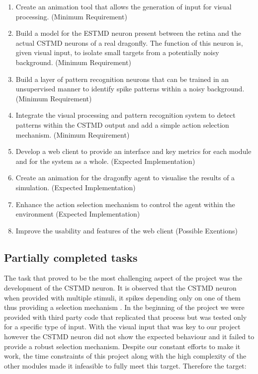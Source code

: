 \documentclass[a4paper,11pt]{article}
\begin{document}
\begin{enumerate}

 \item{Create an animation tool that allows the generation of input for visual processing. (Minimum 
Requirement)}

\item{Build a model for the ESTMD neuron present between the retina and the actual CSTMD 
neurons of a real dragonfly. The function of this neuron is, given visual input, to isolate small targets 
from a potentially noisy background. (Minimum Requirement)}  

\item{Build a layer of pattern recognition neurons that can be trained in an unsupervised manner to 
identify spike patterns within a noisy background. (Minimum Requirement)}

\item{Integrate the visual processing and pattern recognition system to detect patterns within the
CSTMD output and add a simple action selection mechanism. (Minimum Requirement)}

\item{Develop a web client to provide an interface and key metrics for each module and for the 
system as a whole.  (Expected Implementation)}

\item{Create an animation for the dragonfly agent to visualise the results of a simulation. (Expected 
Implementation)}

\item{Enhance the action selection mechanism to control the agent within the environment 
(Expected Implementation)}

\item{Improve the usability and features of the web client (Possible Exentions)}

\end{enumerate}

\subsection{Partially completed tasks}

The task that proved to be the most challenging aspect of the project was the development of the 
CSTMD neuron. It is observed that the CSTMD neuron when provided with multiple stimuli, it spikes 
depending only on one of them thus providing a selection mechanism \cite{?}. In the beginning of 
the project we were provided with third party code that replicated that process but was tested only 
for a specific type of input. With the visual input that was key to our project however the CSTMD 
neuron did not show the expected behaviour and it failed to provide a robust selection mechanism. 
Despite our constant efforts to make it work, the time constraints of this project along with the high 
complexity of the other modules made it infeasible to fully meet this target. Therefore the target:\\
\end{document}
